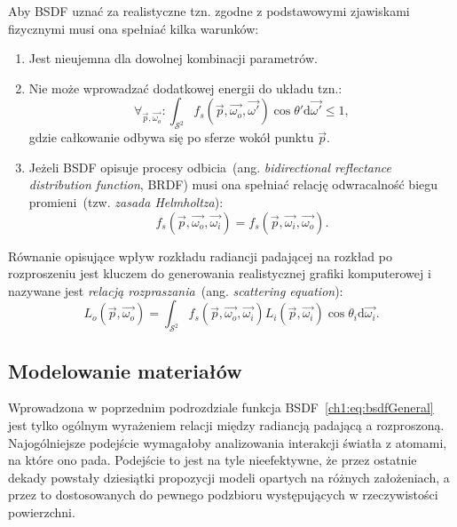 \begin{itemize}
Aby BSDF uznać za realistyczne tzn. zgodne z podstawowymi zjawiskami fizycznymi musi ona spełniać kilka warunków:
\begin{enumerate}
\item Jest nieujemna dla dowolnej kombinacji parametrów.
\item Nie może wprowadzać dodatkowej energii do układu tzn.:
\begin{equation}
\forall_{\vec{p}, \vec{\omega_o}}: \int_{\mathcal{S}^2}f_s(\vec{p}, \vec{\omega_o}, \vec{\omega'})\cos\theta'\mathrm{d}\vec{\omega'} \leq 1,
\end{equation}
gdzie całkowanie odbywa się po sferze wokół punktu $\vec{p}$.
\item Jeżeli BSDF opisuje procesy odbicia~(ang. \textit{bidirectional reflectance distribution function}, BRDF) musi ona spełniać relację odwracalność biegu promieni~(tzw. \textit{zasada Helmholtza}):
\begin{equation}
f_s(\vec{p}, \vec{\omega_o}, \vec{\omega_i}) = f_s(\vec{p}, \vec{\omega_i}, \vec{\omega_o}).
\end{equation}
\end{enumerate}
Równanie opisujące wpływ rozkładu radiancji padającej na rozkład po rozproszeniu jest kluczem do generowania realistycznej grafiki komputerowej i nazywane jest \textit{relacją rozpraszania}~(ang. \textit{scattering equation}):
\begin{equation}
L_o(\vec{p}, \vec{\omega_o}) = \int_{\mathcal{S}^2}f_s(\vec{p}, \vec{\omega_o}, \vec{\omega_i})L_i(\vec{p}, \vec{\omega_i})\cos\theta_i\mathrm{d}\vec{\omega_i}.
\label{ch1:eq:ScatteringEquation}
\end{equation}
\end{itemize}

\subsection{Modelowanie materiałów}
Wprowadzona w poprzednim podrozdziale funkcja BSDF~\eqref{ch1:eq:bsdfGeneral} jest tylko ogólnym wyrażeniem relacji między radiancją padającą a rozproszoną. Najogólniejsze podejście wymagałoby analizowania interakcji światła z atomami, na które ono pada. Podejście to jest na tyle nieefektywne, że przez ostatnie dekady powstały dziesiątki propozycji modeli opartych na różnych założeniach, a przez to dostosowanych do pewnego podzbioru występujących w rzeczywistości powierzchni. 

